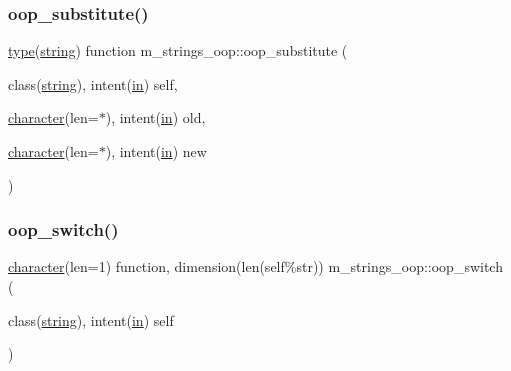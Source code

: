 \subsubsection{\texorpdfstring{oop\+\_\+substitute()}{oop\_substitute()}}
{\footnotesize\ttfamily \hyperlink{stop__watch_83_8txt_a70f0ead91c32e25323c03265aa302c1c}{type}(\hyperlink{structm__strings__oop_1_1string}{string}) function m\+\_\+strings\+\_\+oop\+::oop\+\_\+substitute (\begin{DoxyParamCaption}\item[{class(\hyperlink{structm__strings__oop_1_1string}{string}), intent(\hyperlink{M__journal_83_8txt_afce72651d1eed785a2132bee863b2f38}{in})}]{self,  }\item[{\hyperlink{option__stopwatch_83_8txt_abd4b21fbbd175834027b5224bfe97e66}{character}(len=$\ast$), intent(\hyperlink{M__journal_83_8txt_afce72651d1eed785a2132bee863b2f38}{in})}]{old,  }\item[{\hyperlink{option__stopwatch_83_8txt_abd4b21fbbd175834027b5224bfe97e66}{character}(len=$\ast$), intent(\hyperlink{M__journal_83_8txt_afce72651d1eed785a2132bee863b2f38}{in})}]{new }\end{DoxyParamCaption})\hspace{0.3cm}{\ttfamily [private]}}

\mbox{\label{namespacem__strings__oop_a31be80e67fa4829b5ac48c530bd58b7b}} 
\subsubsection{\texorpdfstring{oop\+\_\+switch()}{oop\_switch()}}
{\footnotesize\ttfamily \hyperlink{option__stopwatch_83_8txt_abd4b21fbbd175834027b5224bfe97e66}{character}(len=1) function, dimension(len(self\%str)) m\+\_\+strings\+\_\+oop\+::oop\+\_\+switch (\begin{DoxyParamCaption}\item[{class(\hyperlink{structm__strings__oop_1_1string}{string}), intent(\hyperlink{M__journal_83_8txt_afce72651d1eed785a2132bee863b2f38}{in})}]{self }\end{DoxyParamCaption})\hspace{0.3cm}{\ttfamily [private]}}

\mbox{\label{namespacem__strings__oop_ac88f27671dd1129023494bf2500ca7fd}} 
